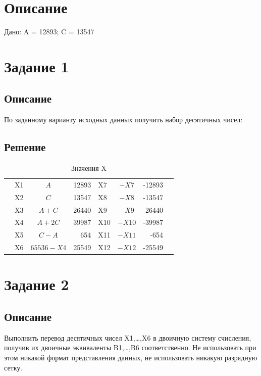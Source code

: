 \documentclass[11pt]{article}
\begin{document}
\section{Описание}
\label{sec:org8cf798b}
Дано: A = 12893; C = 13547
\section{Задание 1}
\label{sec:org40a7e9f}
\subsection{Описание}
\label{sec:org2d0d61e}
По заданному варианту исходных данных получить набор десятичных чисел:
\subsection{Решение}
\label{sec:orgdb23f27}
\setlength{\tabcolsep}{3pt}
\begin{table}[htbp]
\caption{\label{tab:orgdab43ca}
Значения X}
\centering
\begin{tabular}{|llcr|lcrl|}
\hline
 & X1 & \(A\) & 12893 & X7 & \(-X7\) & -12893 & \\
 & X2 & \(C\) & 13547 & X8 & \(-X8\) & -13547 & \\
 & X3 & \(A+C\) & 26440 & X9 & \(-X9\) & -26440 & \\
 & X4 & \(A+2C\) & 39987 & X10 & \(-X10\) & -39987 & \\
 & X5 & \(C-A\) & 654 & X11 & \(-X11\) & -654 & \\
 & X6 & \(65536-X4\) & 25549 & X12 & \(-X12\) & -25549 & \\
\hline
\end{tabular}
\end{table}

\section{Задание 2}
\label{sec:orge9b73aa}
\subsection{Описание}
\label{sec:orgca4a749}
Выполнить перевод десятичных чисел X1,…,X6 в двоичную систему счисления, получив их двоичные эквиваленты B1,…,B6 соответственно.
Не использовать при этом никакой формат представления данных, не использовать никакую разрядную сетку.
\end{document}
